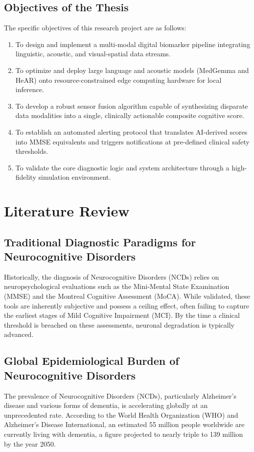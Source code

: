 \documentclass[BTech]{iitmdiss}
\begin{document}
\section{Objectives of the Thesis}
The specific objectives of this research project are as follows:
\begin{enumerate}
    \item To design and implement a multi-modal digital biomarker pipeline integrating linguistic, acoustic, and visual-spatial data streams.
    \item To optimize and deploy large language and acoustic models (MedGemma and HeAR) onto resource-constrained edge computing hardware for local inference.
    \item To develop a robust sensor fusion algorithm capable of synthesizing disparate data modalities into a single, clinically actionable composite cognitive score.
    \item To establish an automated alerting protocol that translates AI-derived scores into MMSE equivalents and triggers notifications at pre-defined clinical safety thresholds.
    \item To validate the core diagnostic logic and system architecture through a high-fidelity simulation environment.
\end{enumerate}

\chapter{Literature Review}
\label{chap:lit_review}

\section{Traditional Diagnostic Paradigms for Neurocognitive Disorders}
Historically, the diagnosis of Neurocognitive Disorders (NCDs) relies on neuropsychological evaluations such as the Mini-Mental State Examination (MMSE) and the Montreal Cognitive Assessment (MoCA). While validated, these tools are inherently subjective and possess a ceiling effect, often failing to capture the earliest stages of Mild Cognitive Impairment (MCI). By the time a clinical threshold is breached on these assessments, neuronal degradation is typically advanced.

\section{Global Epidemiological Burden of Neurocognitive Disorders}
The prevalence of Neurocognitive Disorders (NCDs), particularly Alzheimer's disease and various forms of dementia, is accelerating globally at an unprecedented rate. According to the World Health Organization (WHO) and Alzheimer's Disease International, an estimated 55 million people worldwide are currently living with dementia, a figure projected to nearly triple to 139 million by the year 2050. 
\end{document}
